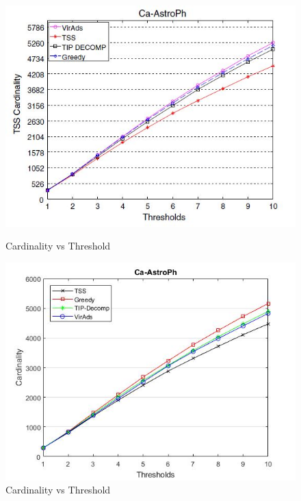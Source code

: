 \begin{figure}[h!]
\begin{minipage}[t]{0.50\textwidth}
\includegraphics[width=\linewidth,keepaspectratio=true]{images/ca-astrophpaper.jpg}
\caption{Cardinality vs Threshold}

\end{minipage}
\begin{minipage}[t]{0.50\textwidth}
\includegraphics[width=\linewidth,keepaspectratio=true]{images/ca-astrophresult.jpg}
\caption{Cardinality vs Threshold}
\end{minipage}
\end{figure}

